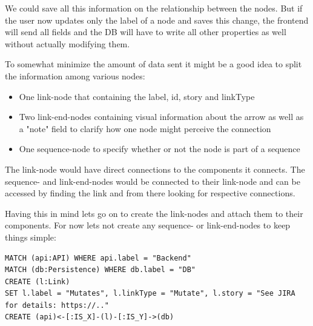 We could save all this information on the relationship between the nodes. But if the user now updates only the label of a node and saves this change, the frontend will send all fields and the DB will have to write all other properties as well without actually modifying them.

To somewhat minimize the amount of data sent it might be a good idea to split the information among various nodes:
\begin{itemize}
\item One link-node that containing the label, id, story and linkType
\item Two link-end-nodes containing visual information about the arrow as well as a "note" field to clarify how one node might perceive the connection
\item One sequence-node to specify whether or not the node is part of a sequence
\end{itemize}

The link-node would have direct connections to the components it connects. The sequence- and link-end-nodes would be connected to their link-node and can be accessed by finding the link and from there looking for respective connections.

Having this in mind lets go on to create the link-nodes and attach them to their components. For now lets not create any sequence- or link-end-nodes to keep things simple:

\begin{lstlisting}
MATCH (api:API) WHERE api.label = "Backend"
MATCH (db:Persistence) WHERE db.label = "DB"
CREATE (l:Link)
SET l.label = "Mutates", l.linkType = "Mutate", l.story = "See JIRA for details: https://.."
CREATE (api)<-[:IS_X]-(l)-[:IS_Y]->(db)
\end{lstlisting}

